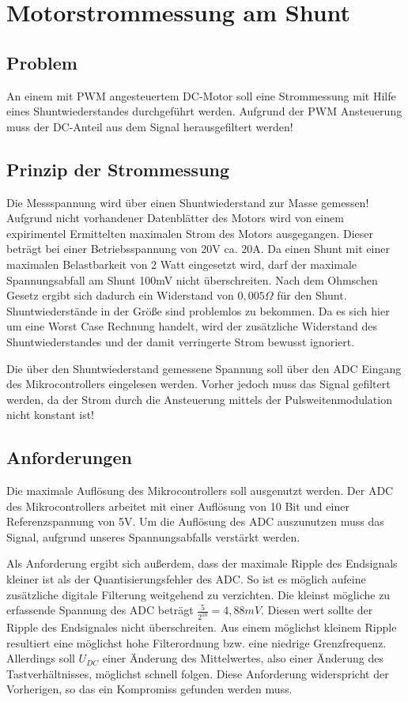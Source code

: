 
\chapter{Motorstrommessung am Shunt}


\section{Problem}

An einem mit PWM angesteuertem DC-Motor soll eine Strommessung mit Hilfe eines Shuntwiederstandes
durchgeführt werden. Aufgrund der PWM Ansteuerung muss der DC-Anteil aus dem Signal herausgefiltert werden!


\section{Prinzip der Strommessung}

Die Messspannung wird über einen Shuntwiederstand zur Masse gemessen! Aufgrund nicht vorhandener Datenblätter des Motors
wird von einem expirimentel Ermittelten maximalen Strom des Motors ausgegangen. Dieser beträgt bei einer Betriebsspannung von 20V ca. 20A.
Da einen Shunt mit einer maximalen Belastbarkeit von 2 Watt eingesetzt wird, darf der maximale Spannungsabfall am Shunt 100mV nicht überschreiten.
Nach dem Ohmschen Gesetz ergibt sich dadurch ein Widerstand von $0,005 \Omega$  für den Shunt. Shuntwiederstände in der Größe sind problemlos zu bekommen.
Da es sich hier um eine Worst Case Rechnung handelt, wird der zusätzliche Widerstand des Shuntwiederstandes und der damit verringerte Strom bewusst ignoriert.

Die über den Shuntwiederstand gemessene Spannung soll über den ADC Eingang des Mikrocontrollers eingelesen werden. Vorher jedoch muss das Signal gefiltert werden, da der Strom
durch die Ansteuerung mittels der Pulsweitenmodulation nicht konstant ist!



\section{Anforderungen}
Die maximale Auflösung des Mikrocontrollers soll ausgenutzt werden. Der ADC des Mikrocontrollers arbeitet mit einer Auflösung von 10 Bit und einer 
Referenzspannung von 5V. Um die Auflösung des ADC auszunutzen muss das Signal, aufgrund unseres Spannungsabfalls verstärkt werden.

Als Anforderung ergibt sich außerdem, dass der maximale Ripple des Endsignals kleiner ist als der Quantisierungsfehler des ADC.
So ist es möglich aufeine zusätzliche digitale Filterung weitgehend zu verzichten.
Die kleinst mögliche zu erfassende Spannung des ADC beträgt $\frac{5}{2^{10}}=4,88mV$.
Diesen wert sollte der Ripple des Endsignales nicht überschreiten.
Aus einem möglichst kleinem Ripple resultiert eine möglichst hohe Filterordnung bzw. eine niedrige Grenzfrequenz.
Allerdings soll $U_{DC}$ einer Änderung des Mittelwertes, also einer Änderung des Tastverhältnisses, möglichst
schnell folgen. Diese Anforderung widerspricht der Vorherigen, so das ein Kompromiss gefunden werden muss.


